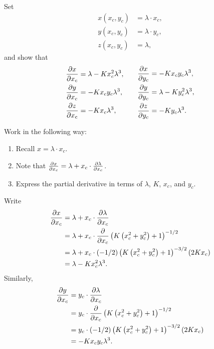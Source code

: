 \documentclass{ximera}
\begin{document}
\begin{problem}
  Set
  \begin{align*}
    x(x_c,y_c) &=\lambda\cdot x_c,\\
    y(x_c,y_c) &=\lambda\cdot y_c,\\
    z(x_c,y_c) &=\lambda,
  \end{align*}
  and show that
  \[
  \begin{split}
    \pp[x]{x_c} &=\lambda -Kx_c^2 \lambda^3,\\
    \pp[y]{x_c} &=-Kx_cy_c \lambda^3,\\
    \pp[z]{x_c} &=-Kx_c \lambda^3,
  \end{split}
  \qquad
  \begin{split}
    \pp[x]{y_c} &= -Kx_cy_c \lambda^3,\\
    \pp[y]{y_c} &= \lambda - Ky_c^2 \lambda^3,\\
    \pp[z]{y_c} &= -Ky_c \lambda^3.
  \end{split}
  \]
  \begin{hint}
  Work in the following way:
  \begin{enumerate}
  \item Recall $x = \lambda\cdot x_c$.
  \item Note that $\pp[x]{x_c} = \lambda + x_c \cdot \pp[\lambda]{x_c}$.
    \item Express the partial derivative in terms of $\lambda$, $K$, $x_c$,
      and $y_c$.
  \end{enumerate}
\end{hint}
  \begin{freeResponse}
    Write
  \begin{align*}
    \pp[x]{x_c} &= \lambda  + x_c \cdot \pp[\lambda]{x_c}\\
    &= \lambda + x_c \cdot \pp{x_c} \left(K\left(x_c^2 + y_c^2\right)+1\right)^{-1/2}\\
    &= \lambda + x_c \cdot (-1/2)\left(K\left(x_c^2 + y_c^2\right)+1\right)^{-3/2}(2Kx_c)\\
    &= \lambda -Kx_c^2 \lambda^3.
  \end{align*}
  Similarly,
    \begin{align*}
    \pp[y]{x_c} &= y_c \cdot \pp[\lambda]{x_c}\\
    &= y_c \cdot \pp{x_c} \left(K\left(x_c^2 + y_c^2\right)+1\right)^{-1/2}\\
    &= y_c \cdot (-1/2)\left(K\left(x_c^2 + y_c^2\right)+1\right)^{-3/2}(2Kx_c)\\
    &= -Kx_cy_c \lambda^3.

\end{align*}
\end{freeResponse}
\end{problem}
\end{document}
